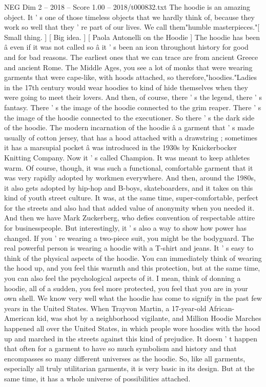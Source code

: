 \begin{textsample}{NEG Dim 2 – 2018 – Score 1.00 – 2018/t000832.txt}  \label{ex:f2_neg_044}
The hoodie is an amazing object.
It ' s one of those timeless objects that we hardly think of, because they work so well that they ' re part of our lives.
We call them"humble masterpieces."[ Small thing. ] [ Big idea. ] [ Paola Antonelli on the Hoodie ] The hoodie has been â even if it was not called so â it ' s been an icon throughout history for good and for bad reasons.
The earliest ones that we can trace are from ancient Greece and ancient Rome.
The Middle Ages, you see a lot of monks that were wearing garments that were cape-like, with hoods attached, so therefore,"hoodies."Ladies in the 17th century would wear hoodies to kind of hide themselves when they were going to meet their lovers.
And then, of course, there ' s the legend, there ' s fantasy.
There ' s the image of the hoodie connected to the grim reaper.
There ' s the image of the hoodie connected to the executioner.
So there ' s the dark side of the hoodie.
The modern incarnation of the hoodie â a garment that ' s made usually of cotton jersey, that has a hood attached with a drawstring ; sometimes it has a marsupial pocket â was introduced in the 1930s by Knickerbocker Knitting Company.
Now it ' s called Champion.
It was meant to keep athletes warm.
Of course, though, it was such a functional, comfortable garment that it was very rapidly adopted by workmen everywhere.
And then, around the 1980s, it also gets adopted by hip-hop and B-boys, skateboarders, and it takes on this kind of youth street culture.
It was, at the same time, super-comfortable, perfect for the streets and also had that added value of anonymity when you needed it.
And then we have Mark Zuckerberg, who defies convention of respectable attire for businesspeople.
But interestingly, it ' s also a way to show how power has changed.
If you ' re wearing a two-piece suit, you might be the bodyguard.
The real powerful person is wearing a hoodie with a T-shirt and jeans.
It ' s easy to think of the physical aspects of the hoodie.
You can immediately think of wearing the hood up, and you feel this warmth and this protection, but at the same time, you can also feel the psychological aspects of it.
I mean, think of donning a hoodie, all of a sudden, you feel more protected, you feel that you are in your own shell.
We know very well what the hoodie has come to signify in the past few years in the United States.
When Trayvon Martin, a 17-year-old African-American kid, was shot by a neighborhood vigilante, and Million Hoodie Marches happened all over the United States, in which people wore hoodies with the hood up and marched in the streets against this kind of prejudice.
It doesn ' t happen that often for a garment to have so much symbolism and history and that encompasses so many different universes as the hoodie.
So, like all garments, especially all truly utilitarian garments, it is very basic in its design.
But at the same time, it has a whole universe of possibilities attached.

\end{textsample}

